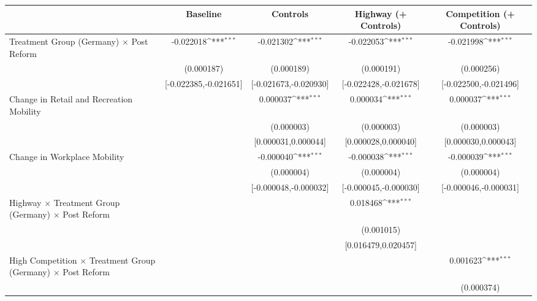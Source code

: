 {
\def\sym#1{\ifmmode^{#1}\else\(^{#1}\)\fi}
\begin{tabular}{l*{4}{c}}
\toprule
                    &\multicolumn{1}{c}{Baseline}&\multicolumn{1}{c}{Controls}&\multicolumn{1}{c}{Highway (+ Controls)}&\multicolumn{1}{c}{Competition (+ Controls)}\\
\midrule
Treatment Group (Germany) $\times$ Post Reform&   -0.022018\sym{***}&   -0.021302\sym{***}&   -0.022053\sym{***}&   -0.021998\sym{***}\\
                    &  (0.000187)         &  (0.000189)         &  (0.000191)         &  (0.000256)         \\
                    &[-0.022385,-0.021651]         &[-0.021673,-0.020930]         &[-0.022428,-0.021678]         &[-0.022500,-0.021496]         \\
Change in Retail and Recreation Mobility&                     &    0.000037\sym{***}&    0.000034\sym{***}&    0.000037\sym{***}\\
                    &                     &  (0.000003)         &  (0.000003)         &  (0.000003)         \\
                    &                     &[0.000031,0.000044]         &[0.000028,0.000040]         &[0.000030,0.000043]         \\
Change in Workplace Mobility&                     &   -0.000040\sym{***}&   -0.000038\sym{***}&   -0.000039\sym{***}\\
                    &                     &  (0.000004)         &  (0.000004)         &  (0.000004)         \\
                    &                     &[-0.000048,-0.000032]         &[-0.000045,-0.000030]         &[-0.000046,-0.000031]         \\
Highway $\times$ Treatment Group (Germany) $\times$ Post Reform&                     &                     &    0.018468\sym{***}&                     \\
                    &                     &                     &  (0.001015)         &                     \\
                    &                     &                     &[0.016479,0.020457]         &                     \\
High Competition $\times$ Treatment Group (Germany) $\times$ Post Reform&                     &                     &                     &    0.001623\sym{***}\\
                    &                     &                     &                     &  (0.000374)         \\

\end{tabular}}
